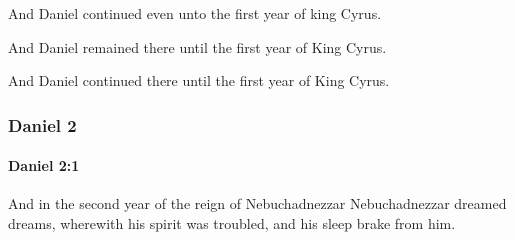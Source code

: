 			\begin{versebox}
					\item[BHS] 
					\item[LXX] 
					\item[ASV] And Daniel continued even unto the first year of king Cyrus.
					\item[NIV] And Daniel remained there until the first year of King Cyrus.
					\item[NRSV] And Daniel continued there until the first year of King Cyrus.
			\end{versebox}
	\subsubsection{Daniel 2} %
		\label{DANIEL-2}

		\paragraph{Daniel 2:1} %
			\label{DANIEL-2-1}

			And in the second year of the reign of Nebuchadnezzar Nebuchadnezzar dreamed dreams, wherewith his spirit was troubled, and his sleep brake from him.

